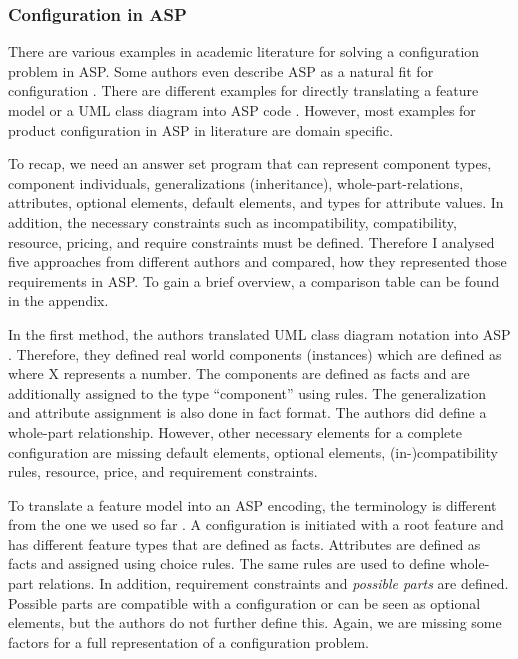 \subsubsection{Configuration in ASP}
There are various examples in academic literature for solving a configuration problem in ASP. Some authors even describe ASP as a natural fit for configuration \cite{sonitisu01a}. There are different examples for directly translating a feature model or a UML class diagram into ASP code \cite{mytirafe14a, hofestrybawo14a}. However, most examples for product configuration in ASP in literature are domain specific.\newline

To recap, we need an answer set program that can represent component types, component individuals, generalizations (inheritance), whole-part-relations, attributes, optional elements, default elements, and types for attribute values. In addition, the necessary constraints such as incompatibility, compatibility, resource, pricing, and require constraints must be defined. Therefore I analysed five approaches from different authors and compared, how they represented those requirements in ASP. To gain a brief overview, a comparison table can be found in the appendix. \newline  

In the first method, the authors translated UML class diagram notation into ASP \cite{hofestrybawo14a}. Therefore, they defined real world components (instances) which are defined as  where X represents a number. The components are defined as facts and are additionally assigned to the type “component” using rules. The generalization and attribute assignment is also done in fact format. The authors did define a whole-part relationship. However, other necessary elements for a complete configuration are missing default elements, optional elements, (in-)compatibility rules, resource, price, and requirement constraints. \newline

To translate a feature model into an ASP encoding, the terminology is different from the one we used so far \cite{mytirafe14a}. A configuration is initiated with a root feature and has different feature types that are defined as facts. Attributes are defined as facts and assigned using choice rules. The same rules are used to define whole-part relations. In addition, requirement constraints and \textit{possible parts} are defined. Possible parts are compatible with a configuration or can be seen as optional elements, but the authors do not further define this. Again, we are missing some factors for a full representation of a configuration problem. \newline

